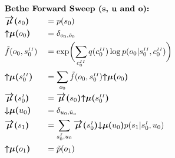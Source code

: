 \documentclass[fleqn]{article}
\begin{document}
\noindent
\setlength{\jot}{0.3em}
\begin{minipage}[t]{0.5\textwidth}
    \begin{alignat}{2}
         & \rlap{\text{\bfseries Bethe Forward Sweep (s, u and o):}} \nonumber                                                                                                                                                                                    \\
         & \bm{\overrightarrow{\mu}(}s_0\bm{)}                                  &  & = p(s_0)                                                                                                                                                                     \\
         & \bm{{\uparrow}{\mu}(}o_0\bm{)}                                       &  & = \delta_{o_0, \hat{o}_0}                                                                                                                                                    \\
         & \tilde{f}(o_0,s^{\scriptscriptstyle II}_0)                           &  & = \exp \biggl(\sum_{c^{\scriptscriptstyle II}_0} q(c^{\scriptscriptstyle II}_0) \log p(o_0|s^{\scriptscriptstyle II}_0,c^{\scriptscriptstyle II}_0) \biggr)                  \\
         & \bm{{\uparrow}{\mu}(}s^{\scriptscriptstyle II}_0\bm{)}               &  & = \sum_{o_0} \tilde{f}(o_0,s^{\scriptscriptstyle II}_0) \bm{{\uparrow}{\mu}(}o_0\bm{)}                                                                                       \\
         & \bm{\overrightarrow{\mu}(}s^{\scriptscriptstyle I}_0\bm{)}           &  & = \bm{\overrightarrow{\mu}(}s_0\bm{)} \bm{{\uparrow}{\mu}(}s^{\scriptscriptstyle II}_0\bm{)}                                                                                 \\
         & \bm{{\downarrow}{\mu}(}u_0\bm{)}                                     &  & = \delta_{u_0,\hat{u}_o}                                                                                                                                                     \\
         & \bm{\overrightarrow{\mu}(}s_1\bm{)}                                  &  & = \sum_{s^{\scriptscriptstyle I}_0, u_0} \bm{\overrightarrow{\mu}(}s^{\scriptscriptstyle I}_0\bm{)} \bm{{\downarrow}{\mu}(}u_0\bm{)} p(s_1|{s^{\scriptscriptstyle I}_0},u_0) \\
         & \bm{{\uparrow}{\mu}(}o_1\bm{)}                                       &  & = \tilde{p}(o_1)                                                                                                                                                             \\

\end{alignat}
\end{minipage}
\end{document}
